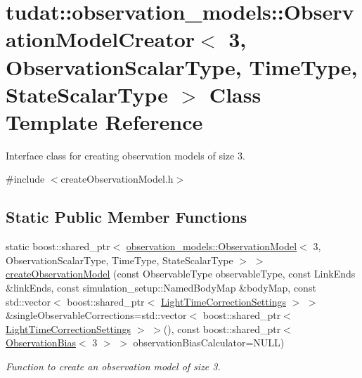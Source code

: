 \hypertarget{classtudat_1_1observation__models_1_1ObservationModelCreator_3_013_00_01ObservationScalarType_0078c72a15a51c4fe05f5fe0bec6a78c76}{}\section{tudat\+:\+:observation\+\_\+models\+:\+:Observation\+Model\+Creator$<$ 3, Observation\+Scalar\+Type, Time\+Type, State\+Scalar\+Type $>$ Class Template Reference}
\label{classtudat_1_1observation__models_1_1ObservationModelCreator_3_013_00_01ObservationScalarType_0078c72a15a51c4fe05f5fe0bec6a78c76}


Interface class for creating observation models of size 3.  




{\ttfamily \#include $<$create\+Observation\+Model.\+h$>$}

\subsection*{Static Public Member Functions}
\begin{DoxyCompactItemize}
\item 
static boost\+::shared\+\_\+ptr$<$ \hyperlink{classtudat_1_1observation__models_1_1ObservationModel}{observation\+\_\+models\+::\+Observation\+Model}$<$ 3, Observation\+Scalar\+Type, Time\+Type, State\+Scalar\+Type $>$ $>$ \hyperlink{classtudat_1_1observation__models_1_1ObservationModelCreator_3_013_00_01ObservationScalarType_0078c72a15a51c4fe05f5fe0bec6a78c76_a795d70afc5bd2116b02ad313b0497735}{create\+Observation\+Model} (const Observable\+Type observable\+Type, const Link\+Ends \&link\+Ends, const simulation\+\_\+setup\+::\+Named\+Body\+Map \&body\+Map, const std\+::vector$<$ boost\+::shared\+\_\+ptr$<$ \hyperlink{classtudat_1_1observation__models_1_1LightTimeCorrectionSettings}{Light\+Time\+Correction\+Settings} $>$ $>$ \&single\+Observable\+Corrections=std\+::vector$<$ boost\+::shared\+\_\+ptr$<$ \hyperlink{classtudat_1_1observation__models_1_1LightTimeCorrectionSettings}{Light\+Time\+Correction\+Settings} $>$ $>$(), const boost\+::shared\+\_\+ptr$<$ \hyperlink{classtudat_1_1observation__models_1_1ObservationBias}{Observation\+Bias}$<$ 3 $>$ $>$ observation\+Bias\+Calculator=N\+U\+LL)
\begin{DoxyCompactList}\small\item\em Function to create an observation model of size 3. \end{DoxyCompactList}\end{DoxyCompactItemize}


